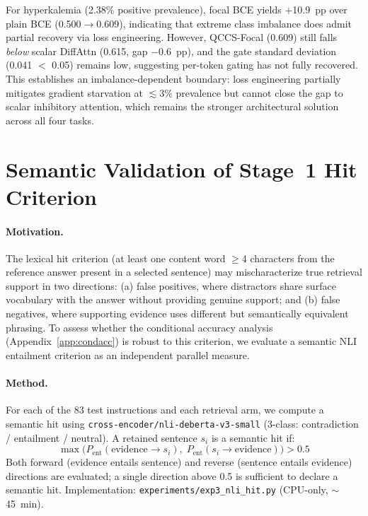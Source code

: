 \documentclass{article}
\begin{document}
For hyperkalemia (2.38\% positive prevalence), focal BCE yields $+$10.9~pp over
plain BCE (0.500$\to$0.609), indicating that extreme class imbalance does admit
partial recovery via loss engineering. However, QCCS-Focal (0.609) still falls
\emph{below} scalar DiffAttn (0.615, gap $-$0.6~pp), and the gate standard deviation
(0.041 $<$ 0.05) remains low, suggesting per-token gating has not fully recovered.
This establishes an imbalance-dependent boundary: loss engineering partially mitigates
gradient starvation at $\lesssim$3\% prevalence but cannot close the gap to scalar
inhibitory attention, which remains the stronger architectural solution across all four tasks.


\section{Semantic Validation of Stage~1 Hit Criterion}
\label{app:nli}

\paragraph{Motivation.}
The lexical hit criterion (at least one content word $\geq$4 characters from
the reference answer present in a selected sentence) may mischaracterize
true retrieval support in two directions: (a) false positives, where
distractors share surface vocabulary with the answer without providing
genuine support; and (b) false negatives, where supporting evidence uses
different but semantically equivalent phrasing. To assess whether the
conditional accuracy analysis (Appendix~\ref{app:condacc}) is robust to
this criterion, we evaluate a semantic NLI entailment criterion as an
independent parallel measure.

\paragraph{Method.}
For each of the 83 test instructions and each retrieval arm, we compute
a semantic hit using \texttt{cross-encoder/nli-deberta-v3-small} (3-class:
contradiction / entailment / neutral). A retained sentence $s_i$ is a
semantic hit if:
\begin{equation}
  \max\!\bigl(P_{\mathrm{ent}}(\text{evidence} \to s_i),\;
              P_{\mathrm{ent}}(s_i \to \text{evidence})\bigr) > 0.5
\end{equation}
Both forward (evidence entails sentence) and reverse (sentence entails
evidence) directions are evaluated; a single direction above 0.5 is
sufficient to declare a semantic hit. Implementation:
\texttt{experiments/exp3\_nli\_hit.py} (CPU-only, $\sim$45~min).
\end{document}
